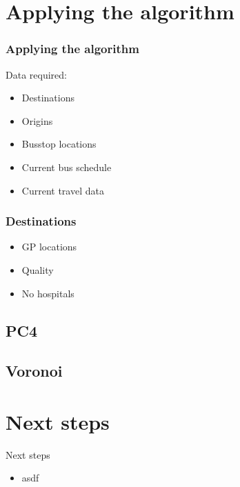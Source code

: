 \documentclass[9pt, aspectratio=43, english]{beamer}
\begin{document}
\section{Applying the algorithm}
\begin{frame}
  \frametitle{Applying the algorithm}

  Data required:
  \begin{itemize}
    \item <1->Destinations
    \item <2->Origins
    \item <3->Busstop locations
    \item <4->Current bus schedule
    \item <5->Current travel data
  \end{itemize}

\end{frame}


\begin{frame}
  \frametitle{Destinations}
  \begin{itemize}
    \item GP locations
    \item Quality 
    \item No hospitals
  \end{itemize}

\end{frame}
\subsection{PC4}


\subsection{Voronoi}


\section{Next steps}
\begin{frame}{Next steps}
    \begin{itemize}
        \item asdf
    \end{itemize}
\end{frame}
\end{document}
